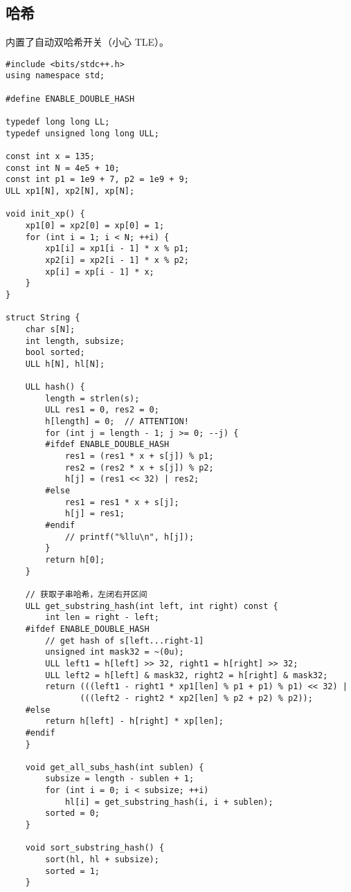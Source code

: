 \documentclass[]{article}
\begin{document}
\hypertarget{ux54c8ux5e0c}{%
\subsection{哈希}\label{ux54c8ux5e0c}}

内置了自动双哈希开关（小心 TLE）。

\begin{verbatim}
#include <bits/stdc++.h>
using namespace std;

#define ENABLE_DOUBLE_HASH

typedef long long LL;
typedef unsigned long long ULL;

const int x = 135;
const int N = 4e5 + 10;
const int p1 = 1e9 + 7, p2 = 1e9 + 9;
ULL xp1[N], xp2[N], xp[N];

void init_xp() {
    xp1[0] = xp2[0] = xp[0] = 1;
    for (int i = 1; i < N; ++i) {
        xp1[i] = xp1[i - 1] * x % p1;
        xp2[i] = xp2[i - 1] * x % p2;
        xp[i] = xp[i - 1] * x;
    }
}

struct String {
    char s[N];
    int length, subsize;
    bool sorted;
    ULL h[N], hl[N];

    ULL hash() {
        length = strlen(s);
        ULL res1 = 0, res2 = 0;
        h[length] = 0;  // ATTENTION!
        for (int j = length - 1; j >= 0; --j) {
        #ifdef ENABLE_DOUBLE_HASH
            res1 = (res1 * x + s[j]) % p1;
            res2 = (res2 * x + s[j]) % p2;
            h[j] = (res1 << 32) | res2;
        #else
            res1 = res1 * x + s[j];
            h[j] = res1;
        #endif
            // printf("%llu\n", h[j]);
        }
        return h[0];
    }

    // 获取子串哈希，左闭右开区间
    ULL get_substring_hash(int left, int right) const {
        int len = right - left;
    #ifdef ENABLE_DOUBLE_HASH
        // get hash of s[left...right-1]
        unsigned int mask32 = ~(0u);
        ULL left1 = h[left] >> 32, right1 = h[right] >> 32;
        ULL left2 = h[left] & mask32, right2 = h[right] & mask32;
        return (((left1 - right1 * xp1[len] % p1 + p1) % p1) << 32) |
               (((left2 - right2 * xp2[len] % p2 + p2) % p2));
    #else
        return h[left] - h[right] * xp[len];
    #endif
    }

    void get_all_subs_hash(int sublen) {
        subsize = length - sublen + 1;
        for (int i = 0; i < subsize; ++i)
            hl[i] = get_substring_hash(i, i + sublen);
        sorted = 0;
    }

    void sort_substring_hash() {
        sort(hl, hl + subsize);
        sorted = 1;
    }


\end{verbatim}
\end{document}
